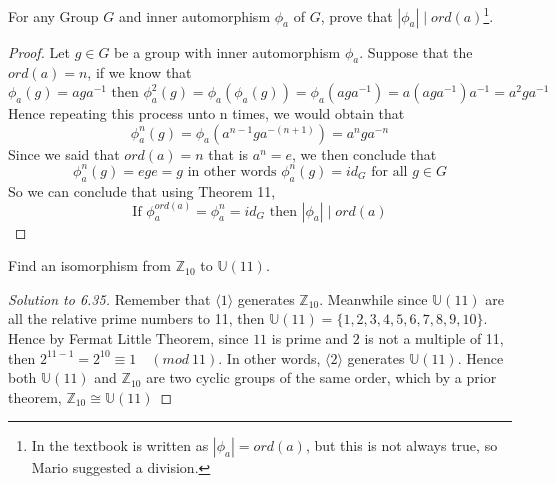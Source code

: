\begin{assignment}[
  header=HeaderA,
  body=BodyA,
  title={Homework 4},
  duedate={\today},
  toc=false,
  toctitle={This appears on the Table of contents.},
  exlist=false
]
\begin{exer}[Problem 6.20]
For any Group $G$ and inner automorphism $\phi_a$ of $G$, prove that $|\phi_a| \mid ord(a)$\footnote{In the textbook is written as $|\phi_a| = ord(a)$, but this is not always true, so Mario suggested a division.}.
\begin{proof}
Let $g\in G$ be a group with inner automorphism $\phi_a$. Suppose that the $ord(a) = n$, if we know that 
\[
\phi_a(g) = aga^{-1} \text{ then } \phi_a^{2}(g) = \phi_a(\phi_a(g)) = \phi_a(aga^{-1}) = a(aga^{-1})a^{-1} = a^2ga^{-1}
\]
Hence repeating this process unto n times, we would obtain that
\[
\phi_a^n(g) = \phi_{a}(a^{n-1}ga^{-(n+1)}) = a^nga^{-n}
\]
Since we said that $ord(a) = n$ that is $a^n = e$, we then conclude that
\[
\phi_a^n(g) = ege = g \text{ in other words } \phi_a^n(g) = id_G \text{ for all } g \in G
\]
So we can conclude that using Theorem 11,
\[
\text{If }\phi_a^{ord(a)} = \phi_a^n = id_G \text{ then } |\phi_a| \mid ord(a)  
\]
\end{proof}    
\end{exer}

\begin{exer}[Problem 6.35]
Find an isomorphism from $\mathbb{Z}_{10}$ to $\mathbb{U}(11)$.
\begin{proof}[Solution to 6.35]
Remember that $\langle 1 \rangle$ generates $\mathbb{Z}_{10}$. Meanwhile since $\mathbb{U}(11)$ are all the relative prime numbers to 11, then $\mathbb{U}(11) = \{1,2,3,4,5,6,7,8,9,10\}$. Hence by Fermat Little Theorem, since $11$ is prime and $2$ is not a multiple of 11, then 
$2^{11-1} = 2^{10} \equiv 1 \quad (mod\ 11)$. In other words, $\langle 2 \rangle$ generates $\mathbb{U}(11)$. Hence both $\mathbb{U}(11)$ and $\mathbb{Z}_{10}$ are two  cyclic groups of the same order, which by a prior theorem, $\mathbb{Z}_{10} \cong \mathbb{U}(11)$ 
\end{proof}    
\end{exer}


\end{assignment}
